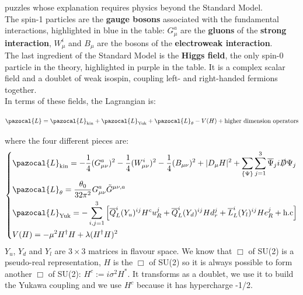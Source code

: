 \documentclass[../main.tex]{subfiles}
\begin{document}
puzzles whose explanation requires physics beyond the Standard Model.\\
The spin-1 particles are the \textbf{gauge bosons} associated with the fundamental interactions, highlighted in blue in the table: $G_\mu^a$ are the \textbf{gluons} of the \textbf{strong interaction}, $W_\mu^i$ and $B_\mu$ are the bosons of the \textbf{electroweak interaction}.\\
The last ingredient of the Standard Model is the \textbf{Higgs field}, the only spin-0 particle in the theory, highlighted in purple in the table. It is a complex scalar field and a doublet of weak isospin, coupling left- and right-handed fermions together.\\
In terms of these fields, the Lagrangian is:
\begin{kaobox}[frametitle=Standard Model Lagrangian]
\[
\pazocal{L}=\pazocal{L}_{\text{kin}}+\pazocal{L}_{\text{Yuk}}+\pazocal{L}_\theta-V(H)+\text{higher dimension operators}
\]
\end{kaobox}
where the four different pieces are:
\[
\left\{
\begin{aligned}
&\pazocal{L}_{\text{kin}}=-\frac{1}{4}(G_{\mu\nu}^a)^2-\frac{1}{4}(W_{\mu\nu}^i)^2-\frac{1}{4}(B_{\mu\nu})^2+|D_\mu H|^2+\sum_{\{\Psi\}}\sum_{j=1}^{3}\overline{\Psi}_ji\slashed{D}\Psi_j\\
&\pazocal{L}_\theta=\frac{\theta_0}{32\pi^2}G_{\mu\nu}^a\Tilde{G}^{\mu\nu,a}\\
&\pazocal{L}_{\text{Yuk}}=-\sum_{i,j=1}^3\left[\overline{Q}_L^i(Y_u)^{ij}H^cu_R^j+\overline{Q}_L^i(Y_d)^{ij}Hd_r^j+\overline{L}_L^i(Y_l)^{ij}He_R^j+\text{h.c}\right]\\
&V(H)=-\mu^2H^\dagger H+\lambda(H^\dagger H)^2
\end{aligned}
\right.
\]
$Y_u$, $Y_d$ and $Y_l$ are $3\times3$ matrices in flavour space. We know that $\Box$ of SU(2) is a pseudo-real representation, $H$ is the $\Box$ of SU(2) so it is always possible to form another $\Box$ of SU(2): $H^c:=i\sigma^2H^*$. It transforms as a doublet, we use it to build the Yukawa coupling and we use $H^c$ because it has hypercharge -1/2.\\
\end{document}
